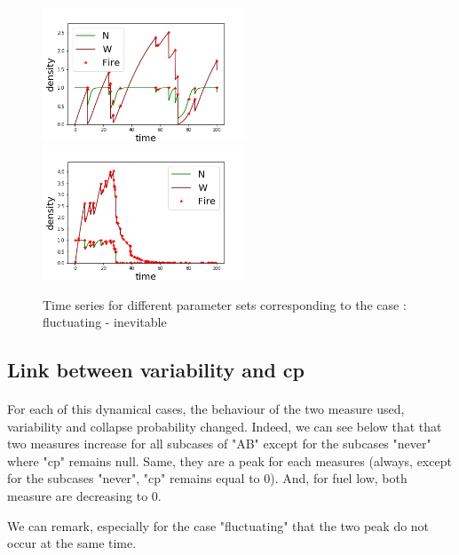 \documentclass{article}
\begin{document}

\begin{figure}[h!]
\centering
\includegraphics[width=6cm]{equivalent_low_between_1.png}
\includegraphics[width=6cm]{equivalent_low_between_2.png}
\caption{Time series for different parameter sets corresponding to the case : fluctuating - inevitable}
\end{figure}




\newpage
\subsection{Link between variability and cp}

\paragraph{}
For each of this dynamical cases, the behaviour of the two measure used, variability and collapse probability changed. Indeed, we can see below that that two measures increase for all subcases of "AB" except for the subcases "never" where "cp" remains null. Same, they are a peak for each measures (always, except for the subcases "never", "cp" remains equal to $0$). And, for fuel low, both measure are decreasing to $0$.

We can remark, especially for the case "fluctuating" that the two peak do not occur at the same time.
\end{document}
